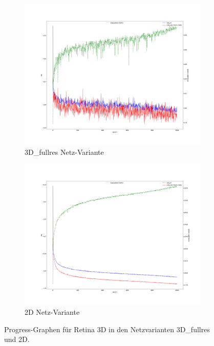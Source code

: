 \begin{figure}[H]
\begin{minipage}{.5\textwidth}
\begin{subfigure}{\textwidth}
\includegraphics[width=\textwidth]{Pictures/nnUnet/Praxis/Task108-Retina3D/progress_108-Retina3D_3dFullres.png}
\caption{3D\_fullres Netz-Variante}
\label{pic:Prog_108-3dfullres}
\end{subfigure}
\end{minipage}
\begin{minipage}{.5\textwidth}
\begin{subfigure}{\textwidth}
\includegraphics[width=\textwidth]{Pictures/nnUnet/Praxis/Task108-Retina3D/progress_108-Retina3D_2DNet.png}
\caption{2D Netz-Variante}
\label{pic:Prog_108-2d}
\end{subfigure}
\end{minipage}
\caption{Progress-Graphen für Retina 3D in den Netzvarianten 3D\_fullres und 2D.}
\label{pic:Prog_108}
\end{figure}




